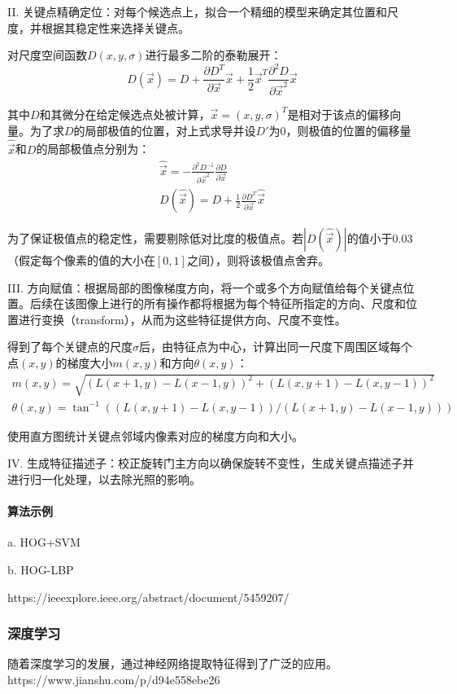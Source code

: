   II. 关键点精确定位：对每个候选点上，拟合一个精细的模型来确定其位置和尺度，并根据其稳定性来选择关键点。

  对尺度空间函数$D(x,y,\sigma)$进行最多二阶的泰勒展开：
$$D(\vec{x})=D+\frac{\partial D^T}{\partial \vec{x}}\vec{x}+\frac{1}{2}\vec{x}^T\frac{\partial^2D}{\partial\vec{x}^2}\vec{x}$$

  其中$D$和其微分在给定候选点处被计算，$\vec{x}=(x,y,\sigma)^T$是相对于该点的偏移向量。为了求$D$的局部极值的位置，对上式求导并设$D'$为0，则极值的位置的偏移量$\hat{\vec{x}}$和$D$的局部极值点分别为：
\begin{gather*}
\hat{\vec{x}}=-\frac{\partial^2 D^{-1}}{\partial \vec{x}^2}\frac{\partial D}{\partial \vec{x}}\\
D(\hat{\vec{x}})=D+\frac{1}{2} \frac{\partial D^T}{\partial \vec{x}} \hat{\vec{x}}
\end{gather*}

  为了保证极值点的稳定性，需要剔除低对比度的极值点。若$|D(\hat{\vec{x}})|$的值小于0.03（假定每个像素的值的大小在$[0,1]$之间），则将该极值点舍弃。

  III. 方向赋值：根据局部的图像梯度方向，将一个或多个方向赋值给每个关键点位置。后续在该图像上进行的所有操作都将根据为每个特征所指定的方向、尺度和位置进行变换（transform），从而为这些特征提供方向、尺度不变性。

  得到了每个关键点的尺度$\sigma$后，由特征点为中心，计算出同一尺度下周围区域每个点$(x,y)$的梯度大小$m(x,y)$和方向$\theta(x,y)$：
\begin{gather*}
m(x,y)=\sqrt{(L(x+1,y)-L(x-1,y))^2+(L(x,y+1)-L(x,y-1))^2}\\
\theta(x,y)=\tan^{-1}((L(x,y+1)-L(x,y-1))/(L(x+1,y)-L(x-1,y)))
\end{gather*}

  使用直方图统计关键点邻域内像素对应的梯度方向和大小。

  IV. 生成特征描述子：校正旋转门主方向以确保旋转不变性，生成关键点描述子并进行归一化处理，以去除光照的影响。

\paragraph{算法示例}
  a. HOG+SVM

  b. HOG-LBP

  https://ieeexplore.ieee.org/abstract/document/5459207/


\subsubsection{深度学习}
  随着深度学习的发展，通过神经网络提取特征得到了广泛的应用。https://www.jianshu.com/p/d94e558ebe26


